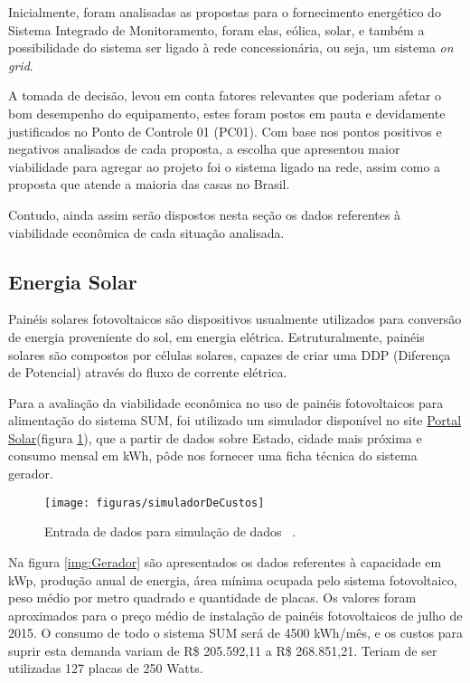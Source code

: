 Inicialmente, foram analisadas as propostas para o fornecimento energético do Sistema Integrado de Monitoramento, foram elas, eólica, solar, e também a possibilidade do sistema ser ligado à rede concessionária, ou seja, um sistema \textit{on grid}.

A tomada de decisão, levou em conta fatores relevantes que poderiam afetar o bom desempenho do equipamento, estes foram postos em pauta e devidamente justificados no Ponto de Controle 01 (PC01). Com base nos pontos positivos e negativos analisados de cada proposta, a escolha que apresentou maior viabilidade para agregar ao projeto foi o sistema ligado na rede, assim como a proposta que atende a maioria das casas no Brasil.

Contudo, ainda assim serão dispostos nesta seção os dados referentes à viabilidade econômica de cada situação analisada.

\subsection{Energia Solar}

Painéis solares fotovoltaicos são dispositivos usualmente utilizados para conversão de energia proveniente do sol, em energia elétrica. Estruturalmente, painéis solares são compostos por células solares, capazes de criar uma DDP (Diferença de Potencial) através do fluxo de corrente elétrica.

Para a avaliação da viabilidade econômica no uso de painéis fotovoltaicos para alimentação do sistema SUM, foi utilizado um simulador disponível no site \href{http://www.portalsolar.com.br/calculo-solar}{Portal Solar}(figura \ref{img:Simulador Solar}), que a partir de dados sobre Estado, cidade mais próxima e consumo mensal em kWh, pôde nos fornecer uma ficha técnica do sistema gerador.

\begin{figure}[H]
	\centering
	\caption{Entrada de dados para simulação de dados ~\cite{simulador}.}
	\texttt{[image: figuras/simuladorDeCustos]}
	\label{img:Simulador Solar}
\end{figure}

Na figura \ref{img:Gerador} são apresentados os dados referentes à capacidade em kWp, produção anual de energia, área mínima ocupada pelo sistema fotovoltaico, peso médio por metro quadrado e quantidade de placas. Os valores foram aproximados para o preço médio de instalação de painéis fotovoltaicos de julho de 2015. O consumo de todo o sistema SUM será de 4500 kWh/mês, e os custos para suprir esta demanda variam de R\$ 205.592,11 a  R\$ 268.851,21. Teriam de ser utilizadas 127 placas de 250 Watts.

